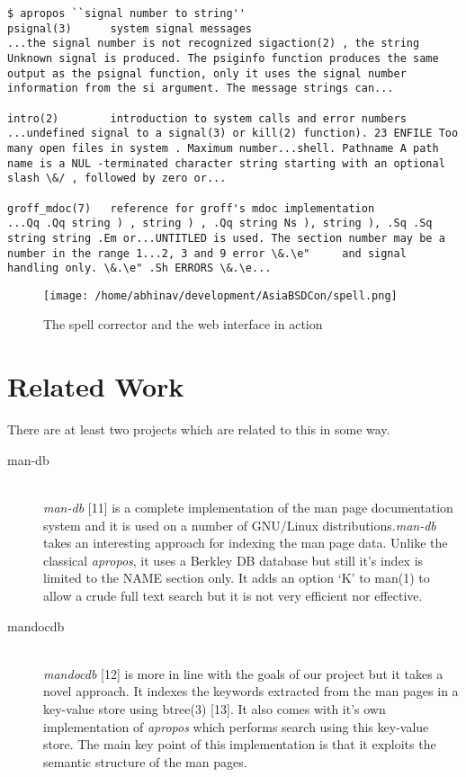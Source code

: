\documentclass[titlepage, a4paper, 12pt]{article}
\begin{document}
\begin{lstlisting}
$ apropos ``signal number to string''
psignal(3)      system signal messages
...the signal number is not recognized sigaction(2) , the string
Unknown signal is produced. The psiginfo function produces the same
output as the psignal function, only it uses the signal number
information from the si argument. The message strings can...

intro(2)        introduction to system calls and error numbers
...undefined signal to a signal(3) or kill(2) function). 23 ENFILE Too
many open files in system . Maximum number...shell. Pathname A path
name is a NUL -terminated character string starting with an optional
slash \&/ , followed by zero or...

groff_mdoc(7)   reference for groff's mdoc implementation
...Qq .Qq string ) , string ) , .Qq string Ns ), string ), .Sq .Sq
string string .Em or...UNTITLED is used. The section number may be a
number in the range 1...2, 3 and 9 error \&.\e"     and signal
handling only. \&.\e" .Sh ERRORS \&.\e...
\end{lstlisting}

\begin{figure}[htp]
\texttt{[image: /home/abhinav/development/AsiaBSDCon/spell.png]}
\caption{The spell corrector and the web interface in action}
\label{}
\end{figure}
\section{Related Work}
There are at least two projects which are related to this in some way.
\begin{description}
\item[man-db] \hfill \\
\textit{man-db} [11] is a complete implementation of the man page documentation
system and it is used on a number of GNU/Linux distributions.\textit{man-db}
takes an interesting approach for indexing the man page data. Unlike the
classical \textit{apropos}, it uses a Berkley DB database but still it's index
is limited to the NAME section only. It adds an option `K' to man(1) to allow a
crude full text search but it is not very efficient nor effective.
\end{description}
\begin{description}
\item[mandocdb] \hfill \\
\textit{mandocdb} [12] is more in line with the goals of our project but it takes
a novel approach. It indexes the keywords extracted from the man pages in a
key-value store using btree(3) [13]. It also comes with it's own implementation
of \textit{apropos} which performs search using this key-value store. The
main key point of this implementation is that it exploits the semantic structure
of the man pages. 
\end{description}
\end{document}
